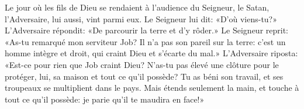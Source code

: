 Le jour où les fils de Dieu se rendaient à l’audience du Seigneur,
	le Satan, l’Adversaire, lui aussi, vint parmi eux.
Le Seigneur lui dit: «D’où viens-tu?»
L’Adversaire répondit: «De parcourir la terre et d’y rôder.»
Le Seigneur reprit: «As-tu remarqué mon serviteur Job?
Il n’a pas son pareil sur la terre:
	c’est un homme intègre et droit, qui craint Dieu et s’écarte du mal.»
L’Adversaire riposta: «Est-ce pour rien que Job craint Dieu?
N’as-tu pas élevé une clôture pour le protéger, lui, sa maison et tout ce qu’il possède?
Tu as béni son travail, et ses troupeaux se multiplient dans le pays.
Mais étends seulement la main, et touche à tout ce qu’il possède:
	je parie qu’il te maudira en face!»
